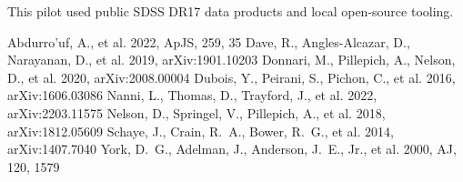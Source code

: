 \documentclass[twocolumn]{aastex631}
\begin{document}
\acknowledgments
This pilot used public SDSS DR17 data products and local open-source tooling.

\begin{thebibliography}{}
 Abdurro'uf, A., et al. 2022, ApJS, 259, 35
 Dave, R., Angles-Alcazar, D., Narayanan, D., et al. 2019, arXiv:1901.10203
 Donnari, M., Pillepich, A., Nelson, D., et al. 2020, arXiv:2008.00004
 Dubois, Y., Peirani, S., Pichon, C., et al. 2016, arXiv:1606.03086
 Nanni, L., Thomas, D., Trayford, J., et al. 2022, arXiv:2203.11575
 Nelson, D., Springel, V., Pillepich, A., et al. 2018, arXiv:1812.05609
 Schaye, J., Crain, R.~A., Bower, R.~G., et al. 2014, arXiv:1407.7040
 York, D.~G., Adelman, J., Anderson, J.~E., Jr., et al. 2000, AJ, 120, 1579
\end{thebibliography}
\end{document}
